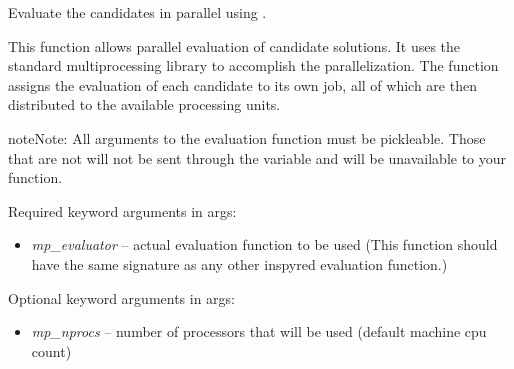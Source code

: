 \documentclass[letterpaper,10pt,english]{sphinxmanual}
\begin{document}
\begin{fulllineitems}
\label{reference:inspyred.ec.evaluators.parallel_evaluation_mp}
Evaluate the candidates in parallel using .

This function allows parallel evaluation of candidate solutions.
It uses the standard multiprocessing library to accomplish the 
parallelization. The function assigns the evaluation of each
candidate to its own job, all of which are then distributed to the
available processing units.

\begin{notice}{note}{Note:}
All arguments to the evaluation function must be pickleable.
Those that are not will not be sent through the  variable
and will be unavailable to your function.
\end{notice}

Required keyword arguments in args:
\begin{itemize}
\item {} 
\emph{mp\_evaluator} -- actual evaluation function to be used (This function
should have the same signature as any other inspyred evaluation function.)

\end{itemize}

Optional keyword arguments in args:
\begin{itemize}
\item {} 
\emph{mp\_nprocs} -- number of processors that will be used (default machine 
cpu count)

\end{itemize}

\end{fulllineitems}

\end{document}
